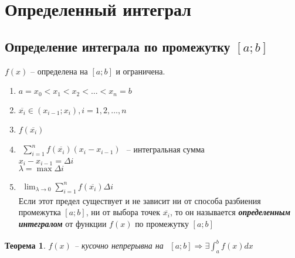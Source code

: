 \documentclass[12pt, fleqn]{book}
\begin{document}
	\section{Определенный интеграл}
	\subsection{Определение интеграла по промежутку $[a;b]$}
	$f(x)$ -- определена на $[a;b]$ и ограничена.
	\begin{enumerate}
		\item $a=x_0<x_1<x_2<\dots<x_n=b$\\
		\item $\overline{x_i}\in \left(x_{i-1}; x_i\right), i = 1,2,\dots,n$
		\item $f\left(\overline{x_i}\right)$
		\item $\begin{gathered}
			\sum_{i=1}^{n}f\left(\overline{x_i}\right)\left(x_i-x_{i-1}\right)
		\end{gathered}$ -- интегральная сумма\\
		$x_i-x_{i-1}=\varDelta i$\\
		$\lambda = \max \varDelta i$
		\item $\begin{gathered}
			\lim_{\lambda\to0}\sum_{i=1}^{n}f\left(\overline{x_i}\right)\varDelta i
		\end{gathered}$\\
		Если этот предел существует и не зависит ни от способа разбиения промежутка $[a;b]$, ни от выбора точек $\overline{x_i}$, то он называется \textbf{\textit{определенным интегралом}} от функции $f(x)$ по промежутку $[a;b]$
	\end{enumerate}
	\newtheorem*{Existing Integral}{Теорема}
	\begin{Existing Integral}
		$f(x)$ -- кусочно непрерывна на $\begin{gathered}
			[a;b] \Rightarrow \exists \int_{a}^{b}f(x)dx
		\end{gathered}$
	\end{Existing Integral}
\end{document}
